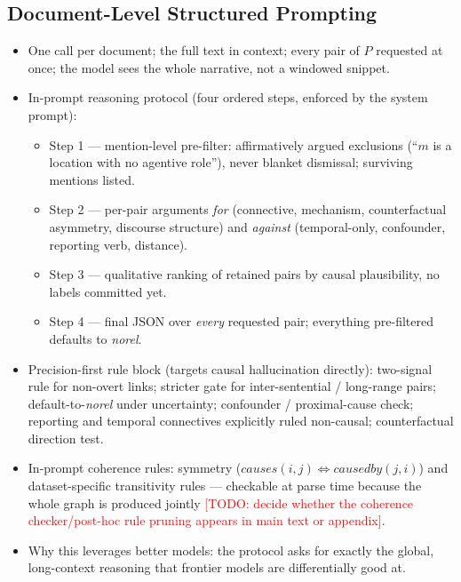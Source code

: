 \documentclass[11pt]{article}
\newcommand{\todo}[1]{\textcolor{red}{[TODO: #1]}}
\newcommand{\method}{SCOTECI}
\begin{document}

\subsection{Document-Level Structured Prompting}
\label{sec:docprompt}
\begin{itemize}
  \item One call per document; the full text in context; every pair of $P$
        requested at once; the model sees the whole narrative, not a windowed
        snippet.
  \item In-prompt reasoning protocol (four ordered steps, enforced by the
        system prompt):
        \begin{itemize}
          \item Step 1 --- mention-level pre-filter: affirmatively argued
                exclusions (``$m$ is a location with no agentive role''), never
                blanket dismissal; surviving mentions listed.
          \item Step 2 --- per-pair arguments \emph{for} (connective, mechanism,
                counterfactual asymmetry, discourse structure) and
                \emph{against} (temporal-only, confounder, reporting verb,
                distance).
          \item Step 3 --- qualitative ranking of retained pairs by causal
                plausibility, no labels committed yet.
          \item Step 4 --- final JSON over \emph{every} requested pair;
                everything pre-filtered defaults to \textit{norel}.
        \end{itemize}
  \item Precision-first rule block (targets causal hallucination directly):
        two-signal rule for non-overt links; stricter gate for inter-sentential
        / long-range pairs; default-to-\textit{norel} under uncertainty;
        confounder / proximal-cause check; reporting and temporal connectives
        explicitly ruled non-causal; counterfactual direction test.
  \item In-prompt coherence rules: symmetry
        ($\textit{causes}(i,j) \Leftrightarrow \textit{causedby}(j,i)$) and
        dataset-specific transitivity rules --- checkable at parse time because
        the whole graph is produced jointly \todo{decide whether the coherence
        checker/post-hoc rule pruning appears in main text or appendix}.
  \item Why this leverages better models: the protocol asks for exactly the
        global, long-context reasoning that frontier models are differentially
        good at.
\end{itemize}
\end{document}
